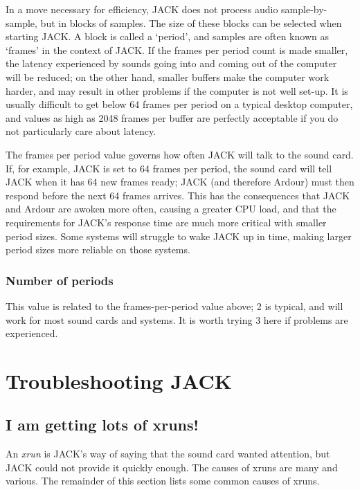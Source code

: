 \documentclass[10pt,a4paper]{book}
\begin{document}
In a move necessary for efficiency, JACK does not process audio
sample-by-sample, but in blocks of samples.  The size of these blocks
can be selected when starting JACK\@.  A block is called a `period',
and samples are often known as `frames' in the context of JACK\@.  If
the frames per period count is made smaller, the latency experienced
by sounds going into and coming out of the computer will be reduced;
on the other hand, smaller buffers make the computer work harder, and
may result in other problems if the computer is not well set-up.  It
is usually difficult to get below 64 frames per period on a typical
desktop computer, and values as high as 2048 frames per buffer are
perfectly acceptable if you do not particularly care about latency.

\begin{danger}
The frames per period value governs how often JACK will talk to the
sound card.  If, for example, JACK is set to 64 frames per period, the
sound card will tell JACK when it has 64 new frames ready; JACK (and
therefore Ardour) must then respond before the next 64 frames arrives.
This has the consequences that JACK and Ardour are awoken more often,
causing a greater CPU load, and that the requirements for JACK's
response time are much more critical with smaller period sizes.  Some
systems will struggle to wake JACK up in time, making larger period
sizes more reliable on those systems.
\end{danger}

\subsubsection{Number of periods}

This value is related to the frames-per-period value above; 2 is
typical, and will work for most sound cards and systems.  It is worth
trying 3 here if problems are experienced.


\section{Troubleshooting JACK}

\subsection{I am getting lots of xruns!}

An \emph{xrun} is JACK's way of saying that the sound card wanted
attention, but JACK could not provide it quickly enough.  The causes
of xruns are many and various.  The remainder of this section lists
some common causes of xruns.
\end{document}
